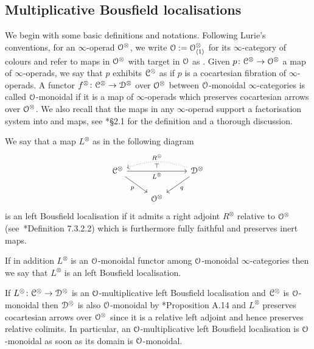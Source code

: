 \subsection{Multiplicative Bousfield localisations}
\label{subsection:multiplicative-localisation}%



We begin with some basic definitions and notations. Following Lurie's conventions, for an $\infty$-operad $\mathcal{O}^\otimes$, we write $\mathcal{O} := \mathcal{O}^\otimes_{\langle 1 \rangle}$ for its $\infty$-category of colours and refer to maps in $\mathcal{O}^{\otimes}$ with target in $\mathcal{O}$ as . Given $p\colon\mathcal C^\otimes \rightarrow \mathcal{O}^\otimes$ a map of $\infty$-operads, we say that $p$ exhibits $\mathcal C^\otimes$ as  if $p$ is a cocartesian fibration of $\infty$-operads. A functor $f^\otimes \colon \mathcal C^\otimes \to \mathcal{D}^\otimes$ over $\mathcal{O}^\otimes$ between $\mathcal{O}$-monoidal $\infty$-categories is called $\mathcal{O}$-monoidal if it is a map of $\infty$-operads which preserves cocartesian arrows over $\mathcal{O}^{\otimes}$. We also recall that the maps in any $\infty$-operad support a factorisation system into  and  maps, see \cite{HA}*{\S 2.1} for the definition and a thorough discussion. 



\begin{definition}
\label{definition:left-bousfield}%
We say that a map $L^{\otimes}$ as in the following diagram
\[
\begin{tikzcd}
\C^{\otimes}\ar[rr, "L^{\otimes}"']\ar[dr,"p"'] && \D^{\otimes}\ar[dl,"q"]\ar[ll,dotted, bend right = 20, "R^{\otimes}"',"\rotatebox{180}{$\perp$}"] \\
& \cO^{\otimes} &
\end{tikzcd}
\]
is 
an  left Bousfield localisation if it admits a
right adjoint $R^{\otimes}$ relative to $\mathcal{O}^{\otimes}$ (see~\cite{HA}*{Definition 7.3.2.2}) which is furthermore %
fully faithful and preserves inert maps. %

If in addition $L^{\otimes}$ is an $\mathcal{O}$-monoidal functor among $\mathcal{O}$-monoidal $\infty$-categories then we say that $L^{\otimes}$ is an  left Bousfield localisation.
\end{definition}



\begin{remark}
\label{remark:automatically-monoidal}%
If $L^{\otimes}\colon \mathcal C^{\otimes} \to \mathcal{D}^{\otimes}$ is an $\mathcal{O}$-multiplicative left Bousfield localisation and $\mathcal C^{\otimes}$ is $\mathcal{O}$-monoidal then $\mathcal{D}^{\otimes}$ is also $\mathcal{O}$-monoidal by \cite{NS}*{Proposition A.14} and $L^{\otimes}$ preserves cocartesian arrows over $\mathcal{O}^{\otimes}$ since it is a relative left adjoint and hence preserves relative colimits. In particular, an $\mathcal{O}$-multiplicative left Bousfield localisation is $\mathcal{O}$-monoidal as soon as its domain is $\mathcal{O}$-monoidal.
\end{remark}




